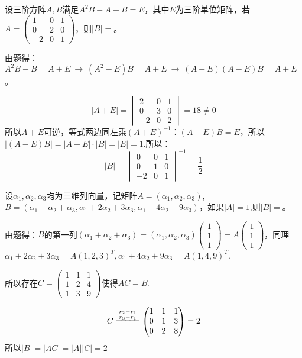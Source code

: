 \documentclass[a4paper]{report}
\begin{document}
\EX 设三阶方阵$A,B$满足$A^2B-A-B=E$，其中$E$为三阶单位矩阵，若$
A=
\begin{pmatrix}
1&0&1\\
0&2&0\\
-2&0&1
\end{pmatrix}
$，则$|B|=$\underline{\hphantom{~~~~~~~~~~}}。

\begin{jie}
由题得：$A^2B-B=A+E~\rightarrow~(A^2-E)B=A+E~\rightarrow~(A+E)(A-E)B=A+E$。

\begin{equation*}
|A+E|=
\begin{vmatrix}
2&0&1\\
0&3&0\\
-2&0&2
\end{vmatrix}=18\neq 0
\end{equation*}
所以$A+E$可逆，等式两边同左乘$(A+E)^{-1}$：$(A-E)B=E$，所以$|(A-E)B|=|A-E|\cdot|B|=|E|=1$.所以：
\begin{equation*}|B|=
\begin{vmatrix}
0&0&1\\
0&1&0\\
-2&0&1
\end{vmatrix}^{-1}=\frac{1}{2}
\end{equation*}
\end{jie}

\EX 设$\alpha_1,\alpha_2,\alpha_3$均为三维列向量，记矩阵$A=
(\alpha_1,\alpha_2,\alpha_3)
$,$B=(\alpha_1+\alpha_2+\alpha_3,\alpha_1+2\alpha_2+3\alpha_3,\alpha_1+4\alpha_2+9\alpha_3)$，如果$|A|=1$,则$|B|=$\underline{\hphantom{~~~~~~~~~~}}。

\begin{jie}
由题得：$B$的第一列$(\alpha_1+\alpha_2+\alpha_3)=(\alpha_1,\alpha_2,\alpha_3)
\begin{pmatrix}
1\\ 1\\ 1
\end{pmatrix}=A\begin{pmatrix}
1\\ 1\\ 1
\end{pmatrix}
$，同理$\alpha_1+2\alpha_2+3\alpha_3=A(1,2,3)^T,\alpha_1+4\alpha_2+9\alpha_3=A(1,4,9)^T$.

所以存在$C=
\begin{pmatrix}
1&1&1\\
1&2&4\\
1&3&9
\end{pmatrix}
$使得$AC=B$.

\begin{align*}
C\xlongequal{\substack{r_2-r_1\\ r_3-r_1}}
\begin{pmatrix}
1&1&1\\
0&1&3\\
0&2&8
\end{pmatrix}=2
\end{align*}
所以$|B|=|AC|=|A||C|=2$
\end{jie}
\end{document}
